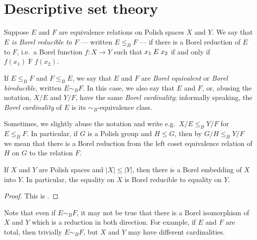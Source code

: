 	\section{Descriptive set theory}
	
	\begin{dfn}
		\label{dfn:borel_cardinality}
		Suppose $E$ and $F$ are equivalence relations on Polish spaces $X$ and $Y$. We say that \emph{$E$ is Borel reducible to $F$} --- written $E\leq_B F$ --- if there is a Borel reduction of $E$ to $F$, i.e.\ a Borel function $f\colon X\to Y$ such that $x_1\mathrel{E} x_2$ if and only if $f(x_1)\mathrel{F} f(x_2)$.
		
		If $E\leq_B F$ and $F\leq_B E$, we say that $E$ and $F$ are \emph{Borel equivalent} or \emph{Borel bireducible}, written $E\sim_B F$. In this case, we also say that $E$ and $F$, or, abusing the notation, $X/E$ and $Y/F$, have the same {\em Borel cardinality}; informally speaking, the {\em Borel cardinality} of $E$ is its $\sim_B$-equivalence class.
		\xqed{\lozenge}
	\end{dfn}
	
	\begin{rem}
		Sometimes, we slightly abuse the notation and write e.g.\ $X/E\leq_B Y/F$ for $E\leq_B F$. In particular, if $G$ is a Polish group and $H\leq G$, then by $G/H\leq_B Y/F$ we mean that there is a Borel reduction from the left coset equivalence relation of $H$ on $G$ to the relation $F$.
		\xqed{\lozenge}
	\end{rem}
	
	\begin{fct}
		\label{fct:borel_isom}
		If $X$ and $Y$ are Polish spaces and $\lvert X\rvert \leq \lvert Y\rvert $, then there is a Borel embedding of $X$ into $Y$. In particular, the equality on $X$ is Borel reducible to equality on $Y$.
	\end{fct}
	\begin{proof}
		This is \cite[Theorem 15.6]{Kec95}.
	\end{proof}
	
	
	\begin{rem}
		Note that even if $E\sim_B F$, it may not be true that there is a Borel isomorphism of $X$ and $Y$ which is a reduction in both direction. For example, if $E$ and $F$ are total, then trivially $E\sim_B F$, but $X$ and $Y$ may have different cardinalities.
		\xqed{\lozenge}
	\end{rem}
	
